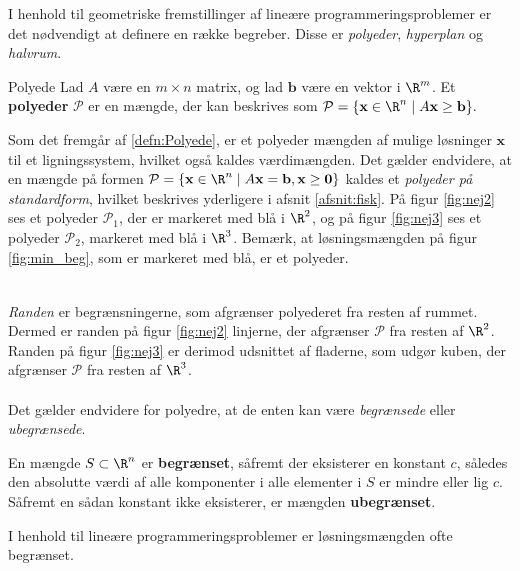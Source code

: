 I henhold til geometriske fremstillinger af lineære programmeringsproblemer er det nødvendigt at definere en række begreber.
Disse er \textit{polyeder}, \textit{hyperplan} og \textit{halvrum}.
%
\begin{defn}{}{Polyede}
Lad $A$ være en $m \times n$ matrix, og lad $\mathbf{b}$ være en vektor i  $\R^m$.
Et \textbf{polyeder} $\mathcal{P}$ er en mængde, der kan beskrives som 
$\mathcal{P} = \{\textbf{x} \in \R^n \mid A\mathbf{x}\geq \textbf{b}\}.$
%
\end{defn}
\noindent
%
Som det fremgår af \ref{defn:Polyede}, er et polyeder mængden af mulige løsninger $\mathbf{x}$ til et ligningssystem, hvilket også kaldes værdimængden.
Det gælder endvidere, at en mængde på formen $\mathcal{P} = \{\textbf{x} \in \R^n \mid A\textbf{x} = \textbf{b},\textbf{x} \geq \textbf{0} \}$ kaldes et \textit{polyeder på standardform}, hvilket beskrives yderligere i afsnit \ref{afsnit:fisk}.
%
%
På figur \ref{fig:nej2} ses et polyeder $\mathcal{P}_1$, der er markeret med blå i $\R^2$, og på figur \ref{fig:nej3} ses et polyeder $\mathcal{P}_2$, markeret med blå i $\R^3$.
Bemærk, at løsningsmængden på figur \ref{fig:min_beg}, som er markeret med blå, er et polyeder.
%
%
\begin{center}
$
\begin{array}{cc}
&

\end{array}
$
\end{center}
%
\textit{Randen} er begrænsningerne, som afgrænser polyederet fra resten af rummet. 
Dermed er randen på figur \ref{fig:nej2} linjerne, der afgrænser $\mathcal{P}$ fra resten af $\R^2$.
Randen på figur \ref{fig:nej3} er derimod udsnittet af fladerne, som udgør kuben, der afgrænser $\mathcal{P}$ fra resten af $\R^3$.
\\\\
%
Det gælder endvidere for polyedre, at de enten kan være \textit{begrænsede} eller \textit{ubegrænsede}.
%
\begin{defn}{}{}
En mængde $S \subset \R^n$ er \textbf{begrænset}, såfremt der eksisterer en konstant $c$, således den absolutte værdi af alle komponenter i alle elementer i $S$ er mindre eller lig $c$. 
Såfremt en sådan konstant ikke eksisterer, er mængden \textbf{ubegrænset}.
\end{defn}
\noindent
% 
%
%
I henhold til lineære programmeringsproblemer er løsningsmængden ofte begrænset.
